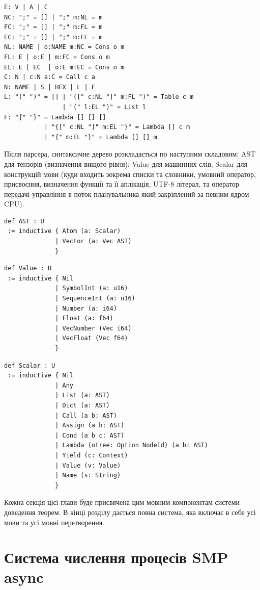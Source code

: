 \begin{lstlisting}[mathescape=true]
E: V | A | C
NC: ";" = [] | ";" m:NL = m
FC: ";" = [] | ";" m:FL = m
EC: ";" = [] | ";" m:EL = m
NL: NAME | o:NAME m:NC = Cons o m
FL: E | o:E | m:FC = Cons o m
EL: E | EC  | o:E m:EC = Cons o m
C: N | c:N a:C = Call c a
N: NAME | S | HEX | L | F
L: "(" ")" = [] | "([" c:NL "]" m:FL ")" = Table c m
                | "(" l:EL ")" = List l
F: "{" "}" = Lambda [] [] []
           | "{[" c:NL "]" m:EL "}" = Lambda [] c m
           | "{" m:EL "}" = Lambda [] [] m
\end{lstlisting}

Після парсера, синтаксичне дерево розкладається по наступним складовим: AST для
тензорів (визначення вищого рівня); Value для машинних слів; Scalar для
конструкцій мови (куди входить зокрема списки та словники, умовний оператор,
присвоєння, визначення функції та її аплікація, UTF-8 літерал, та оператор
передачі управління в поток планувальника який закріплений за певним ядром CPU).

\begin{lstlisting}
def AST : U
 := inductive { Atom (a: Scalar)
              | Vector (a: Vec AST)
              }
\end{lstlisting}

\begin{lstlisting}
def Value : U
 := inductive { Nil
              | SymbolInt (a: u16)
              | SequenceInt (a: u16)
              | Number (a: i64)
              | Float (a: f64)
              | VecNumber (Vec i64)
              | VecFloat (Vec f64)
              }
\end{lstlisting}

\newpage
\begin{lstlisting}
def Scalar : U
 := inductive { Nil
              | Any
              | List (a: AST)
              | Dict (a: AST)
              | Call (a b: AST)
              | Assign (a b: AST)
              | Cond (a b c: AST)
              | Lambda (otree: Option NodeId) (a b: AST)
              | Yield (c: Context)
              | Value (v: Value)
              | Name (s: String)
              }
\end{lstlisting}

Кожна секція цієї глави буде присвячена цим мовним компонентам
системи доведення теорем. В кінці розділу дається повна система, яка включає в себе усі
мови та усі мовні перетворення.

\section{Система числення процесів SMP async}

